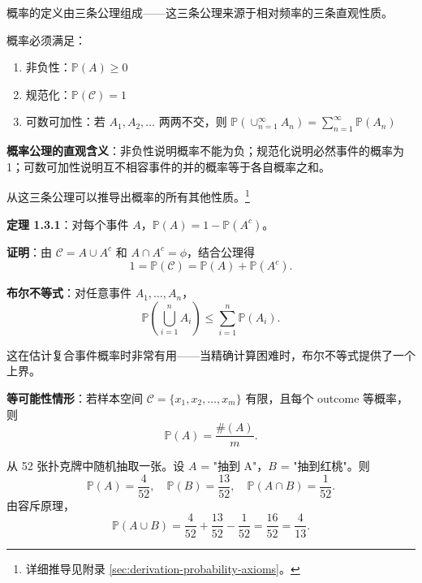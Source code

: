 概率的定义由三条公理组成——这三条公理来源于相对频率的三条直观性质。

概率必须满足：
\begin{enumerate}
    \item 非负性：$\mathbb{P}(A) \geq 0$
    \item 规范化：$\mathbb{P}(\mathcal{C}) = 1$
    \item 可数可加性：若 $A_1, A_2, \ldots$ 两两不交，则 $\mathbb{P}(\cup_{n=1}^{\infty} A_n) = \sum_{n=1}^{\infty} \mathbb{P}(A_n)$
\end{enumerate}

\begin{remark}
\textbf{概率公理的直观含义}：非负性说明概率不能为负；规范化说明必然事件的概率为 1；可数可加性说明互不相容事件的并的概率等于各自概率之和。
\end{remark}

从这三条公理可以推导出概率的所有其他性质。\footnote{详细推导见附录 \cref{sec:derivation-probability-axioms}。}

\begin{remark}
\textbf{定理 1.3.1}：对每个事件 $A$，$\mathbb{P}(A) = 1 - \mathbb{P}(A^c)$。

\textbf{证明}：由 $\mathcal{C} = A \cup A^c$ 和 $A \cap A^c = \phi$，结合公理得
\[
1 = \mathbb{P}(\mathcal{C}) = \mathbb{P}(A) + \mathbb{P}(A^c).
\]
\end{remark}

\textbf{布尔不等式}：对任意事件 $A_1, \ldots, A_n$，
\[
\mathbb{P}\left(\bigcup_{i=1}^{n} A_i\right) \leq \sum_{i=1}^{n} \mathbb{P}(A_i).
\label{eq:boole-inequality-ch1}
\]

这在估计复合事件概率时非常有用——当精确计算困难时，布尔不等式提供了一个上界。

\begin{remark}
\textbf{等可能性情形}：若样本空间 $\mathcal{C} = \{x_1, x_2, \ldots, x_m\}$ 有限，且每个 outcome 等概率，则
\[
\mathbb{P}(A) = \frac{\#(A)}{m}.
\label{eq:equilikely-ch1}
\]
\end{remark}

\begin{example}[扑克牌概率]\label{ex:poker-ch1}
从 52 张扑克牌中随机抽取一张。设 $A$ = "抽到 A"，$B$ = "抽到红桃"。则
\[
\mathbb{P}(A) = \frac{4}{52}, \quad \mathbb{P}(B) = \frac{13}{52}, \quad \mathbb{P}(A \cap B) = \frac{1}{52}.
\]
由容斥原理，
\[
\mathbb{P}(A \cup B) = \frac{4}{52} + \frac{13}{52} - \frac{1}{52} = \frac{16}{52} = \frac{4}{13}.
\]
\end{example}

